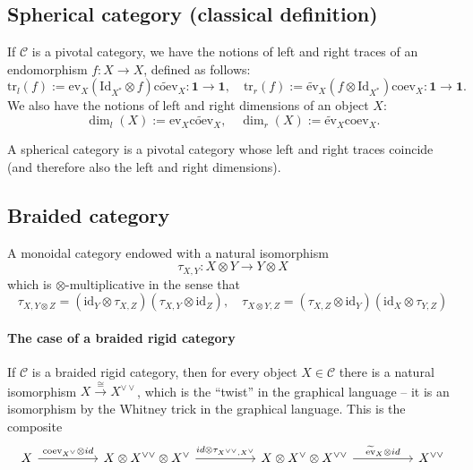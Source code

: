 \documentclass[11pt]{article}
\newcommand{\C}{\mathcal{C}}
\theoremstyle{definition}
\begin{document}
\subsection{Spherical category (classical definition)}\label{subsec:spherical_classical}
If \( \mathcal{C} \) is a pivotal category, we have the notions of left and right traces of an endomorphism  \(f: X \to X \), defined as follows:
\[ \mathrm{tr}_l (f) := \mathrm{ev}_X(\mathrm{Id}_{X^*}\otimes f)\widetilde{\mathrm{coev}}_X : \mathbf{1} \to \mathbf{1}, \quad
\mathrm{tr}_r (f) :=  \widetilde{\mathrm{ev}}_X (f \otimes \mathrm{Id}_{X^*})\mathrm{coev}_X: \mathbf{1} \to \mathbf{1}. \]
We also have the notions of left and right dimensions of an object \( X\):
\[ \dim_l(X):= \mathrm{ev}_X \widetilde{\mathrm{coev}}_X, \quad \dim_r(X):= \widetilde{\mathrm{ev}}_X\mathrm{coev}_X. \]

A spherical category is a pivotal category whose left and right traces coincide (and therefore also the left and right dimensions).

\subsection{Braided category}
A monoidal category endowed with a natural isomorphism
\[ \tau_{X,Y}: X \otimes Y \to Y  \otimes X \]
which is \(\otimes \)-multiplicative in the sense that
\[
\tau_{X, Y \otimes Z} = (\mathrm{id}_Y \otimes \tau_{X, Z})(\tau_{X, Y} \otimes \mathrm{id}_Z), \quad
\tau_{X \otimes Y, Z} = (\tau_{X, Z} \otimes \mathrm{id}_Y)(\mathrm{id}_X \otimes \tau_{Y, Z})
\]


\paragraph{The case of a braided rigid category}

If $\C$ is  a braided rigid category, then for every object $X \in \C$ there is a natural isomorphism $X \overset{\cong}{\to} X^{\vee \vee}$, which is the ``twist'' in the graphical language -- it is an isomorphism by the Whitney trick in the graphical language. This is the composite
\begin{equation}\label{eq:braided_rigid_iso}
\begin{tikzcd}
    X \arrow{rr}{ \mathrm{coev}_{X^{\vee }} \otimes id} && X \otimes X^{\vee \vee} \otimes X^{\vee} \arrow{rr}{id \otimes \tau_{X^{\vee \vee},X^{\vee }}} && X \otimes X^{\vee} \otimes X^{\vee  \vee} \arrow{rr}{ \widetilde{\mathrm{ev}}_X  \otimes id} && X^{\vee  \vee}
\end{tikzcd}
\end{equation}
\end{document}

